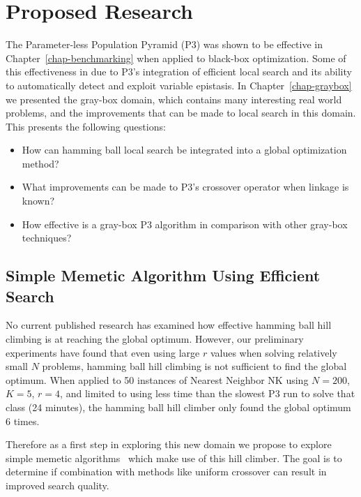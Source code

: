 \chapter{Proposed Research}
The Parameter-less Population Pyramid (P3) was shown to be effective in Chapter~\ref{chap-benchmarking}
when applied to black-box optimization. Some of this effectiveness in due to P3's integration of
efficient local search and its ability to automatically detect and exploit variable epistasis.
In Chapter~\ref{chap-graybox} we presented the gray-box domain, which contains many interesting
real world problems, and the improvements that can be made to local search in this domain.
This presents the following questions:

\begin{itemize}
\item How can hamming ball local search be integrated into a global optimization method?
\item What improvements can be made to P3's crossover operator when linkage is known?
\item How effective is a gray-box P3 algorithm in comparison with other gray-box techniques?
\end{itemize}

\section{Simple Memetic Algorithm Using Efficient Search}
No current published research has examined how effective hamming ball hill climbing is at reaching the global
optimum. However, our preliminary experiments have found that even using large $r$ values when solving relatively small $N$
problems, hamming ball hill climbing is not sufficient to find the global optimum. When applied to 50 instances
of Nearest Neighbor NK using $N=200$, $K=5$, $r=4$, and limited to using less time than the slowest P3 run to solve that class (24 minutes),
the hamming ball hill climber only found the global optimum 6 times.

Therefore as a first step in exploring this new domain we propose to explore simple memetic algorithms~\cite{chen:2011:memetic}
which make use of this hill climber. The goal is to determine if combination with methods like uniform crossover
can result in improved search quality.

